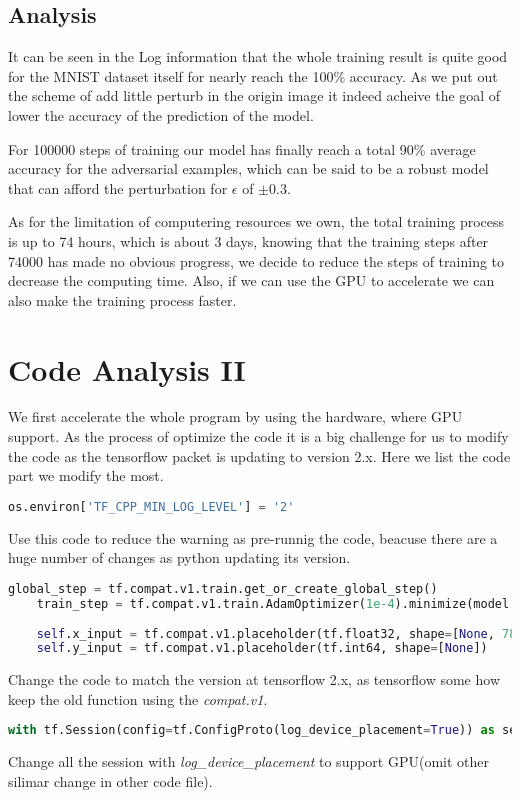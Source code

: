 \documentclass[
	letterpaper, %
	10pt, %
]{CSUniSchoolLabReport}
\begin{document}
\subsection{Analysis}
It can be seen in the Log information that the whole training result is quite good for the MNIST dataset itself for nearly reach the 100\% accuracy. As we put out the scheme of add little perturb in the origin image it indeed acheive the goal of lower the accuracy of the prediction of the model. 

For 100000 steps of training our model has finally reach a total 90\% average accuracy for the adversarial examples, which can be said to be a robust model that can afford the perturbation for $\epsilon$ of $\pm$0.3.

As for the limitation of computering resources we own, the total  training process is up to 74 hours, which is about 3 days, knowing that the training steps after 74000 has made no obvious progress, we decide to reduce the steps of training to decrease the computing time. Also, if we can use the GPU to accelerate we can also make the training process faster.
\section{Code Analysis II}
We first accelerate the whole program by using the hardware, where GPU support. As the process of optimize the code it is a big challenge for us to modify the code as the tensorflow packet is updating to version 2.x. Here we list the code part we modify the most.
\begin{lstlisting}[language=Python]
	os.environ['TF_CPP_MIN_LOG_LEVEL'] = '2'
\end{lstlisting}
Use this code to reduce the warning as pre-runnig the code, beacuse there are a huge number of changes as python updating its version.
\begin{lstlisting}[language=Python]
	global_step = tf.compat.v1.train.get_or_create_global_step()
	train_step = tf.compat.v1.train.AdamOptimizer(1e-4).minimize(model.xent, global_step=global_step)
	
	self.x_input = tf.compat.v1.placeholder(tf.float32, shape=[None, 784])
	self.y_input = tf.compat.v1.placeholder(tf.int64, shape=[None])
\end{lstlisting}
Change the code to match the version at tensorflow 2.x, as tensorflow some how keep the old function using the \emph{compat.v1}.
\begin{lstlisting}[language=Python]
	with tf.Session(config=tf.ConfigProto(log_device_placement=True)) as sess:
\end{lstlisting}
Change all the session with \emph{log\_device\_placement} to support GPU(omit other silimar change in other code file).
\end{document}
